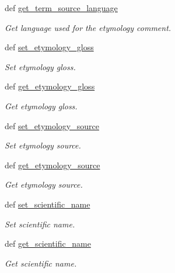 \begin{DoxyCompactItemize}
def \hyperlink{classlmf_1_1src_1_1core_1_1sense_1_1_sense_ab6f704b6dd461728169ffb3c74e43896}{get\+\_\+term\+\_\+source\+\_\+language}
\begin{DoxyCompactList}\small\item\em Get language used for the etymology comment. \end{DoxyCompactList}\item 
def \hyperlink{classlmf_1_1src_1_1core_1_1sense_1_1_sense_a2008e37c341cb4bb59bae4ed74bddef2}{set\+\_\+etymology\+\_\+gloss}
\begin{DoxyCompactList}\small\item\em Set etymology gloss. \end{DoxyCompactList}\item 
def \hyperlink{classlmf_1_1src_1_1core_1_1sense_1_1_sense_adb7c6fd2e19771361a94025df3343a58}{get\+\_\+etymology\+\_\+gloss}
\begin{DoxyCompactList}\small\item\em Get etymology gloss. \end{DoxyCompactList}\item 
def \hyperlink{classlmf_1_1src_1_1core_1_1sense_1_1_sense_ad869f9c4fcfca1775a74f6e1370c3476}{set\+\_\+etymology\+\_\+source}
\begin{DoxyCompactList}\small\item\em Set etymology source. \end{DoxyCompactList}\item 
def \hyperlink{classlmf_1_1src_1_1core_1_1sense_1_1_sense_a58b3a4780ebc7fec50bd5088fef02d87}{get\+\_\+etymology\+\_\+source}
\begin{DoxyCompactList}\small\item\em Get etymology source. \end{DoxyCompactList}\item 
def \hyperlink{classlmf_1_1src_1_1core_1_1sense_1_1_sense_a98dae38e1997fb9e04cf2ad8ee47591a}{set\+\_\+scientific\+\_\+name}
\begin{DoxyCompactList}\small\item\em Set scientific name. \end{DoxyCompactList}\item 
def \hyperlink{classlmf_1_1src_1_1core_1_1sense_1_1_sense_adeaf450f92e0f7726c1152f4d8b1944d}{get\+\_\+scientific\+\_\+name}
\begin{DoxyCompactList}\small\item\em Get scientific name. \end{DoxyCompactList}\item 

\end{DoxyCompactItemize}
